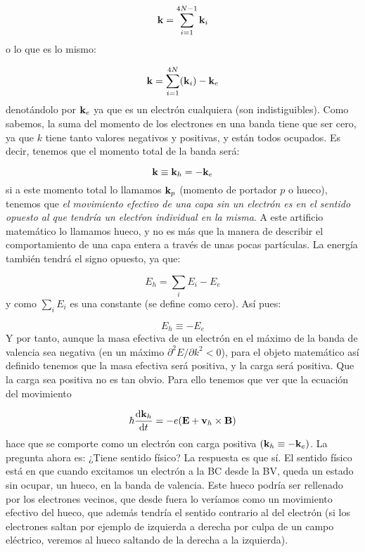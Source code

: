 \begin{equation}
	\mathbf{k} = \sum_{i=1}^{4N-1} \mathbf{k}_i 
\end{equation}
o lo que es lo mismo:

\begin{equation}
	\mathbf{k} = \sum_{i=1}^{4N} (\mathbf{k}_i) - \mathbf{k}_e
\end{equation}
denotándolo por $\mathbf{k}_e$ ya que es un electrón cualquiera (son indistiguibles). Como sabemos, la suma del momento de los electrones en una banda tiene que ser cero, ya que $k$ tiene tanto valores negativos y positivas, y están todos ocupados. Es decir, tenemos que el momento total de la banda será:

\begin{equation}
	\mathbf{k} \equiv \mathbf{k}_h = - \mathbf{k}_e
\end{equation}
si a este momento total lo llamamos $\mathbf{k}_p$ (momento de portador $p$ o hueco), tenemos que \textit{el movimiento efectivo de una capa sin un electrón es en el sentido opuesto al que tendría un electŕon individual en la misma}. A este artificio matemático lo llamamos hueco, y no es más que la manera de describir el comportamiento de una capa entera a través de unas pocas partículas. La energía también tendrá el signo opuesto, ya que:

\begin{equation}
	E_h = \sum_{i} E_i - E_e 
\end{equation}
y como $\sum_{i}E_i$ es una constante (se define como cero). Así pues:

\begin{equation}
	E_h \equiv - E_e
\end{equation}
Y por tanto, aunque la masa efectiva de un electrón en el máximo de la banda de valencia sea negativa (en un máximo $\partial^2 E/ \partial k^2<0$), para el objeto matemático así definido tenemos que la masa efectiva será positiva, y la carga será positiva. Que la carga sea positiva no es tan obvio. Para ello tenemos que ver que la ecuación del movimiento 

\begin{equation}
	\hbar \frac{\mathrm{d} \mathbf{k}_h}{\mathrm{d} t} = -e(\mathbf{E} + \mathbf{v}_h \times \mathbf{B})
\end{equation}
hace que se comporte como un electrón con carga positiva $(\mathbf{k}_h \equiv - \mathbf{k}_e)$. La pregunta ahora es: ¿Tiene sentido físico? La respuesta es que sí. El sentido físico está en que cuando excitamos un electrón a la BC desde la BV, queda un estado sin ocupar, un hueco, en la banda de valencia. Este hueco podría ser rellenado por los electrones vecinos, que desde fuera lo veríamos como un movimiento efectivo del hueco, que además tendría el sentido contrario al del electrón (si los electrones saltan por ejemplo de izquierda a derecha por culpa de un campo eléctrico, veremos al hueco saltando de la derecha a la izquierda). 

